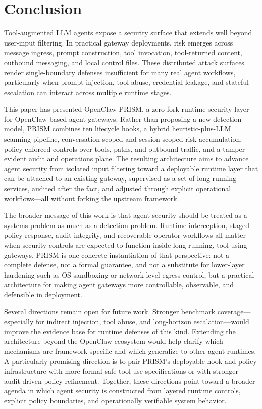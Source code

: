 \section{Conclusion}

Tool-augmented LLM agents expose a security surface that extends well beyond user-input filtering. In practical gateway deployments, risk emerges across message ingress, prompt construction, tool invocation, tool-returned content, outbound messaging, and local control files. These distributed attack surfaces render single-boundary defenses insufficient for many real agent workflows, particularly when prompt injection, tool abuse, credential leakage, and stateful escalation can interact across multiple runtime stages.

This paper has presented OpenClaw PRISM, a zero-fork runtime security layer for OpenClaw-based agent gateways. Rather than proposing a new detection model, PRISM combines ten lifecycle hooks, a hybrid heuristic-plus-LLM scanning pipeline, conversation-scoped and session-scoped risk accumulation, policy-enforced controls over tools, paths, and outbound traffic, and a tamper-evident audit and operations plane. The resulting architecture aims to advance agent security from isolated input filtering toward a deployable runtime layer that can be attached to an existing gateway, supervised as a set of long-running services, audited after the fact, and adjusted through explicit operational workflows---all without forking the upstream framework.

The broader message of this work is that agent security should be treated as a systems problem as much as a detection problem. Runtime interception, staged policy response, audit integrity, and recoverable operator workflows all matter when security controls are expected to function inside long-running, tool-using gateways. PRISM is one concrete instantiation of that perspective: not a complete defense, not a formal guarantee, and not a substitute for lower-layer hardening such as OS sandboxing or network-level egress control, but a practical architecture for making agent gateways more controllable, observable, and defensible in deployment.

Several directions remain open for future work. Stronger benchmark coverage---especially for indirect injection, tool abuse, and long-horizon escalation---would improve the evidence base for runtime defenses of this kind. Extending the architecture beyond the OpenClaw ecosystem would help clarify which mechanisms are framework-specific and which generalize to other agent runtimes. A particularly promising direction is to pair PRISM's deployable hook and policy infrastructure with more formal safe-tool-use specifications or with stronger audit-driven policy refinement. Together, these directions point toward a broader agenda in which agent security is constructed from layered runtime controls, explicit policy boundaries, and operationally verifiable system behavior.

